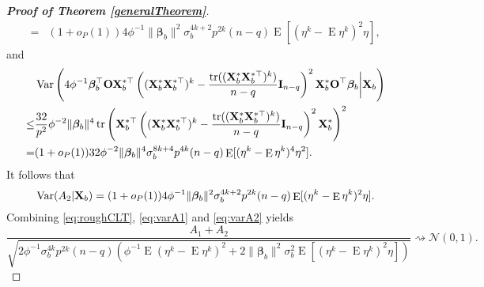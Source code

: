 \documentclass[11pt]{article}
\DeclareMathOperator{\mytr}{tr}
\DeclareMathOperator{\myE}{E}
\DeclareMathOperator{\myVar}{Var}
\newcommand{\bfsym}[1]{\ensuremath{\boldsymbol{#1}}}
\def\bbeta{\bfsym \beta}
\theoremstyle{plain}
\theoremstyle{definition}
\theoremstyle{remark}
\begin{document}
\begin{appendices}
\begin{proof}[\textbf{Proof of Theorem \ref{generalTheorem}}]
\begin{equation*}
\begin{split}
=&
(1+o_P(1)) 4\phi^{-1} \|\bbeta_b\|^2
\sigma_b^{4k+2} p^{2k} (n-q) \myE [(\eta^k -\myE \eta^k)^2 \eta]
,
    \end{split}
\end{equation*}
and
\begin{equation*}
    \begin{split}
        &
                \myVar\left(
                    4\phi^{-1} \bbeta_b^\top \BO  \BX_b^{*\top}
                    \left( (\BX_b^*  \BX_b^{*\top})^{k} 
                        -\frac{\mytr ( (\BX_b^*  \BX_b^{*\top})^{k})}{n-q} 
                \BI_{n-q}
            \right)^2  \BX_b^* \BO^\top  \bbeta_b
            \bigg| \BX_b
        \right)
        \\
        \leq&
        \frac{32}{p^2} \phi^{-2} \|\bbeta_b\|^4
        \mytr
        \Bigg(
\BX_b^{*\top}
                    \left( (\BX_b^*  \BX_b^{*\top})^{k} 
                        -\frac{\mytr ( (\BX_b^*  \BX_b^{*\top})^{k})}{n-q} 
                \BI_{n-q}
            \right)^2  \BX_b^*
        \Bigg)^2
        \\
        =&
        (1+o_P(1))
        32 \phi^{-2} \|\bbeta_b\|^4
        \sigma_b^{8k + 4} p^{4k} (n-q)
        \myE [(\eta^k - \myE \eta^k)^4 \eta^2]
        .
    \end{split}
\end{equation*}
It follows that
\begin{equation}\label{eq:varA2}
    \myVar (A_2 | \BX_b)= 
        (1+o_P(1))4
        \phi^{-1}
        \|\bbeta_b\|^2
        \sigma_b^{4k+2} p^{2k} (n-q)
        \myE [(\eta^k -\myE \eta^k)^2 \eta]
        .
\end{equation}
Combining \eqref{eq:roughCLT}, \eqref{eq:varA1} and \eqref{eq:varA2} yields
\begin{equation}\label{eq:roughCLT2}
    \frac{
        A_1+A_2
    }{\sqrt{
            2\phi^{-1}
            \sigma_b^{4k} p^{2k}
            (n-q)
            \left( 
                \phi^{-1} \myE (\eta^k - \myE \eta^k)^2
                +
                2\|\bbeta_b\|^2 \sigma_b^2 \myE [(\eta^k - \myE \eta^k)^2\eta]
            \right)
    }} \rightsquigarrow \mathcal N(0,1).
\end{equation}


\end{proof}
\end{appendices}
\end{document}
